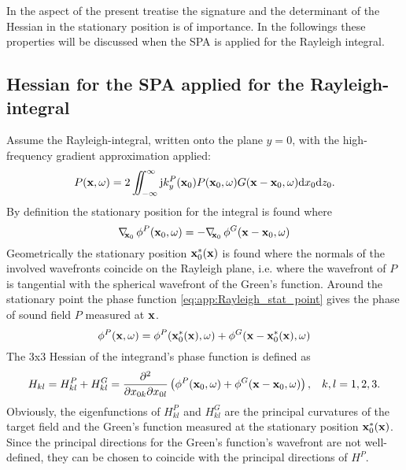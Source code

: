 \vspace{3mm}
In the aspect of the present treatise the signature and the determinant of the Hessian in the stationary position is of importance.
In the followings these properties will be discussed when the SPA is applied for the Rayleigh integral.

\subsection{Hessian for the SPA applied for the Rayleigh-integral}

Assume the Rayleigh-integral, written onto the plane $y = 0$, with the high-frequency gradient approximation applied:
\begin{equation}
P(\mathbf{x},\omega) = 2 \int\!\!\!\!\!\int_{-\infty}^{\infty} \mathrm{j} k_y^P(\mathbf{x}_0) P(\mathbf{x}_0, \omega) G(\mathbf{x}-\mathbf{x}_0,\omega) \mathrm{d} x_0  \mathrm{d} z_0.
\end{equation}
By definition the stationary position for the integral is found where
\begin{equation}
\label{eq:app:Rayleigh_stat_point}
\nabla_{\!\!\mathbf{x}_0}\, \phi^P(\mathbf{x}_0,\omega) = -\nabla_{\!\!\mathbf{x}_0}\, \phi^G(\mathbf{x}-\mathbf{x}_0,\omega)  \\
\end{equation}
Geometrically the stationary position $\mathbf{x}_0^*(\mathbf{x})$ is found where the normals of the involved wavefronts coincide on the Rayleigh plane, i.e. where the wavefront of $P$ is tangential with the spherical wavefront of the Green's function.
Around the stationary point the phase function \eqref{eq:app:Rayleigh_stat_point} gives the phase of sound field $P$ measured at $\mathbf{x}$.
\begin{equation}
\phi^P(\mathbf{x},\omega) = \phi^P(\mathbf{x}_0^*(\mathbf{x}),\omega) + \phi^G(\mathbf{x}-\mathbf{x}_0^*(\mathbf{x}),\omega)  \\
\end{equation}
The 3x3 Hessian of the integrand's phase function is defined as
\begin{equation}
\label{eq:app:Hessian_for_Rayleigh}
H_{kl} = H_{kl}^P+ H_{kl}^G = \frac{\partial^2}{\partial x_{0 k} \partial x_{0 l}}\left( \phi^P(\mathbf{x}_0,\omega) + \phi^G(\mathbf{x}-\mathbf{x}_0,\omega) \right), \hspace{3mm} k,l = 1,2,3.
\end{equation}
Obviously, the eigenfunctions of $H_{kl}^P$ and $H_{kl}^G$ are the principal curvatures of the target field and the Green's function measured at the stationary position $\mathbf{x}_0^*(\mathbf{x})$.
Since the principal directions for the Green's function's wavefront are not well-defined, they can be chosen to coincide with the principal directions of $H^P$.
